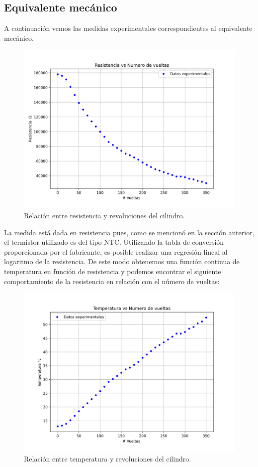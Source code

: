 \documentclass{article}
\begin{document}
\subsection{Equivalente mecánico}
A continuación vemos las medidas experimentales correspondientes al equivalente mecánico.
\begin{figure}[H]
    \centering
    \includegraphics[scale=0.5]{RvsV.png}
    \caption{Relación entre resistencia y revoluciones del cilindro.}
    \label{fig:mecresrev}
\end{figure}
La medida está dada en resistencia pues, como se mencionó en la sección anterior, el termistor utilizado es del tipo NTC. Utilizando la tabla de conversión proporcionada por el fabricante\cite{pasco}, es posible realizar una regresión lineal al logaritmo de la resistencia. De este modo obtenemos una función continua de temperatura en función de resistencia y podemos encontrar el siguiente comportamiento de la resistencia en relación con el número de vueltas:
\begin{figure}[H]
    \centering
    \includegraphics[scale=0.5]{TvsV.png}
    \caption{Relación entre temperatura y revoluciones del cilindro.}
    \label{fig:mectemprev}
\end{figure}
\end{document}
